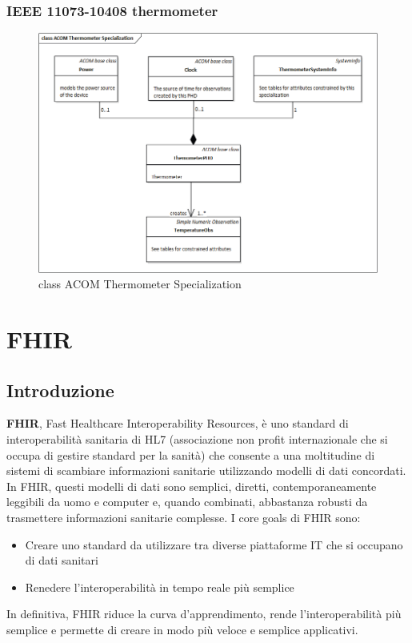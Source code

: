 \documentclass{article}
\begin{document}
\subsubsection{IEEE 11073-10408 thermometer}
\begin{figure}[H]
    \centering
    \includegraphics[width=1\textwidth]{figures/ACOM thermometer specialization class.png}
    \caption{class ACOM Thermometer Specialization}
\end{figure}

\section{FHIR}

\subsection{Introduzione}
\textbf{FHIR}, Fast Healthcare Interoperability Resources, è uno standard di interoperabilità sanitaria di HL7 (associazione non profit internazionale che si occupa di gestire standard per la sanità)
che consente a una moltitudine di sistemi di scambiare informazioni sanitarie utilizzando modelli di dati concordati. In FHIR, questi modelli di dati sono semplici, diretti, contemporaneamente
leggibili da uomo e computer e, quando combinati, abbastanza robusti da trasmettere informazioni sanitarie complesse.
I core goals di FHIR sono:

\begin{itemize}
    \item Creare uno standard da utilizzare tra diverse piattaforme IT che si occupano di dati sanitari
    \item Renedere l'interoperabilità in tempo reale più semplice
\end{itemize}
In definitiva, FHIR riduce la curva d'apprendimento, rende l'interoperabilità più semplice e permette di creare in modo più veloce e semplice applicativi.
\end{document}
